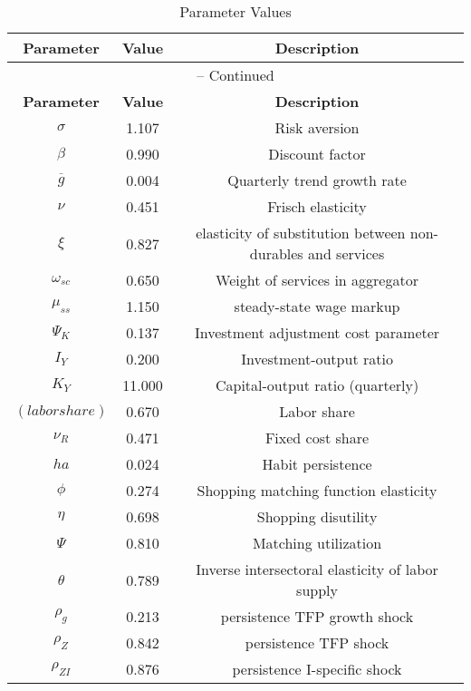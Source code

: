 \begin{center}
\begin{longtable}{ccc}
\caption{Parameter Values}\\%
\toprule%
\multicolumn{1}{c}{\textbf{Parameter}} &
\multicolumn{1}{c}{\textbf{Value}} &
 \multicolumn{1}{c}{\textbf{Description}}\\%
\midrule%
\endfirsthead
\multicolumn{3}{c}{{\tablename} \thetable{} -- Continued}\\%
\midrule%
\multicolumn{1}{c}{\textbf{Parameter}} &
\multicolumn{1}{c}{\textbf{Value}} &
  \multicolumn{1}{c}{\textbf{Description}}\\%
\midrule%
\endhead
${\sigma}$ 	 & 	 1.107 	 & 	 Risk aversion\\
${\beta}$ 	 & 	 0.990 	 & 	 Discount factor\\
${\overline{g}}$ 	 & 	 0.004 	 & 	 Quarterly trend growth rate\\
$\nu$ 	 & 	 0.451 	 & 	 Frisch elasticity\\
$\xi$ 	 & 	 0.827 	 & 	 elasticity of substitution between non-durables and services\\
$\omega_{sc}$ 	 & 	 0.650 	 & 	 Weight of services in aggregator\\
$\mu_{ss}$ 	 & 	 1.150 	 & 	 steady-state wage markup\\
${\Psi_{K}}$ 	 & 	 0.137 	 & 	 Investment adjustment cost parameter\\
${I_Y}$ 	 & 	 0.200 	 & 	 Investment-output ratio\\
${K_Y}$ 	 & 	 11.000 	 & 	 Capital-output ratio (quarterly)\\
$(labor share)$ 	 & 	 0.670 	 & 	 Labor share\\
${\nu_R}$ 	 & 	 0.471 	 & 	 Fixed cost share\\
${ha}$ 	 & 	 0.024 	 & 	 Habit persistence\\
${\phi}$ 	 & 	 0.274 	 & 	 Shopping matching function elasticity\\
${\eta}$ 	 & 	 0.698 	 & 	 Shopping disutility\\
${\Psi}$ 	 & 	 0.810 	 & 	 Matching utilization\\
${\theta}$ 	 & 	 0.789 	 & 	 Inverse intersectoral elasticity of labor supply\\
${\rho_g}$ 	 & 	 0.213 	 & 	 persistence TFP growth shock\\
${\rho_Z}$ 	 & 	 0.842 	 & 	 persistence TFP shock\\
${\rho_{ZI}}$ 	 & 	 0.876 	 & 	 persistence I-specific shock\\

\end{longtable}
\end{center}
